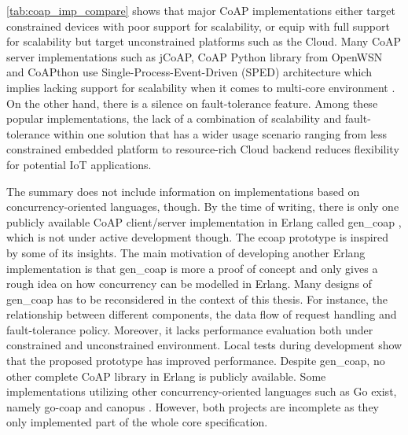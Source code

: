 \autoref{tab:coap_imp_compare} shows that major CoAP implementations either target constrained devices with poor support for scalability, or equip with full support for scalability but target unconstrained platforms such as the Cloud. Many CoAP server implementations such as jCoAP, CoAP Python library from OpenWSN and CoAPthon use Single-Process-Event-Driven (SPED) architecture which implies lacking support for scalability when it comes to multi-core environment \autocite{kovatsch2015scalable}. On the other hand, there is a silence on fault-tolerance feature. Among these popular implementations, the lack of a combination of scalability and fault-tolerance within one solution that has a wider usage scenario ranging from less constrained embedded platform to resource-rich Cloud backend reduces flexibility for potential IoT applications.

The summary does not include information on implementations based on concurrency-oriented languages, though. By the time of writing, there is only one publicly available CoAP client/server implementation in Erlang called gen\_coap \autocite{gen_coap}, which is not under active development though. The ecoap prototype is inspired by some of its insights. The main motivation of developing another Erlang implementation is that gen\_coap is more a proof of concept and only gives a rough idea on how concurrency can be modelled in Erlang. Many designs of gen\_coap has to be reconsidered in the context of this thesis. For instance, the relationship between different components, the data flow of request handling and fault-tolerance policy. Moreover, it lacks performance evaluation both under constrained and unconstrained environment. Local tests during development show that the proposed prototype has improved performance. Despite gen\_coap, no other complete CoAP library in Erlang is publicly available. Some implementations utilizing other concurrency-oriented languages such as Go \autocite{go} exist, namely go-coap \autocite{go-coap} and canopus \autocite{canopus}. However, both projects are incomplete as they only implemented part of the whole core specification. 
 

